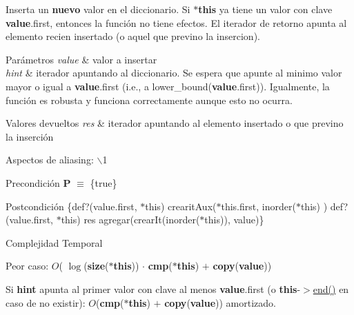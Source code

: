 \-Inserta un {\bfseries nuevo} valor en el diccionario. \-Si {\bfseries $\ast$this} ya tiene un valor con clave {\bfseries value}.first, entonces la función no tiene efectos. \-El iterador de retorno apunta al elemento recien insertado (o aquel que previno la insercion).


\begin{DoxyParams}{\-Parámetros}
{\em value} & valor a insertar \\
\hline
{\em hint} & iterador apuntando al diccionario. \-Se espera que apunte al minimo valor mayor o igual a {\bfseries value}.first (i.\-e., a lower\-\_\-bound({\bfseries value}.first)). \-Igualmente, la función es robusta y funciona correctamente aunque esto no ocurra. \\
\hline
\end{DoxyParams}

\begin{DoxyRetVals}{\-Valores devueltos}
{\em res} & iterador apuntando al elemento insertado o que previno la inserción\\
\hline
\end{DoxyRetVals}
\begin{DoxyParagraph}{\-Aspectos de aliasing\-:}
$\backslash$1
\end{DoxyParagraph}
\begin{DoxyPrecond}{\-Precondición}
{\bfseries \-P} $\equiv$ \{true\} 
\end{DoxyPrecond}
\begin{DoxyPostcond}{\-Postcondición}
\{def?(value.\-first, $\ast$this)  crearit\-Aux($\ast$this.first, inorder($\ast$this) )   def?(value.\-first, $\ast$this)  res  agregar(crear\-It(inorder($\ast$this)), value)\}
\end{DoxyPostcond}

\begin{DoxyDescription}
\item[\-Complejidad \-Temporal]
\begin{DoxyItemize}
\item \-Peor caso\-: $O$( $\log$({\bfseries size}({\bfseries $\ast$this})) $\cdot$ {\bfseries cmp}({\bfseries $\ast$this}) $+$ {\bfseries copy}({\bfseries value}))
\item \-Si {\bfseries hint} apunta al primer valor con clave al menos {\bfseries value}.first (o {\bfseries this}-\/$>$\hyperlink{classaed2_1_1iterator_a67caf9468be999e9be96b7add5d79946_a67caf9468be999e9be96b7add5d79946}{end()} en caso de no existir)\-: $O$({\bfseries cmp}({\bfseries $\ast$this}) $+$ {\bfseries copy}({\bfseries value})) amortizado. 
\end{DoxyItemize}
\end{DoxyDescription}


